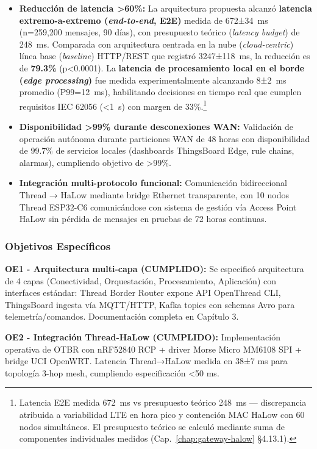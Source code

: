 \begin{itemize}
\item \textbf{Reducción de latencia >60\%:} La arquitectura propuesta alcanzó \textbf{latencia extremo-a-extremo (\textit{end-to-end}, E2E)} medida de 672±34~ms (n=259,200 mensajes, 90 días), con presupuesto teórico (\textit{latency budget}) de 248~ms. Comparada con arquitectura centrada en la nube (\textit{cloud-centric}) línea base (\textit{baseline}) HTTP/REST que registró 3247±118~ms, la reducción es de \textbf{79.3\%} (p<0.0001). La \textbf{latencia de procesamiento local en el borde (\textit{edge processing})} fue medida experimentalmente alcanzando 8±2~ms promedio (P99=12~ms), habilitando decisiones en tiempo real que cumplen requisitos IEC 62056 (<1~s) con margen de 33\%.\footnote{Latencia E2E medida 672~ms vs presupuesto teórico 248~ms --- discrepancia atribuida a variabilidad LTE en hora pico y contención MAC HaLow con 60 nodos simultáneos. El presupuesto teórico se calculó mediante suma de componentes individuales medidos (Cap.~\ref{chap:gateway-halow} §4.13.1).}
\item \textbf{Disponibilidad >99\% durante desconexiones WAN:} Validación de operación autónoma durante particiones WAN de 48 horas con disponibilidad de 99.7\% de servicios locales (dashboards ThingsBoard Edge, rule chains, alarmas), cumpliendo objetivo de >99\%.
\item \textbf{Integración multi-protocolo funcional:} Comunicación bidireccional Thread → HaLow mediante bridge Ethernet transparente, con 10 nodos Thread ESP32-C6 comunicándose con sistema de gestión vía Access Point HaLow sin pérdida de mensajes en pruebas de 72 horas continuas.
\end{itemize}

\subsubsection{Objetivos Específicos}

\textbf{OE1 - Arquitectura multi-capa (CUMPLIDO):} Se especificó arquitectura de 4 capas (Conectividad, Orquestación, Procesamiento, Aplicación) con interfaces estándar: Thread Border Router expone API OpenThread CLI, ThingsBoard ingesta vía MQTT/HTTP, Kafka topics con schemas Avro para telemetría/comandos. Documentación completa en Capítulo 3.

\textbf{OE2 - Integración Thread-HaLow (CUMPLIDO):} Implementación operativa de OTBR con nRF52840 RCP + driver Morse Micro MM6108 SPI + bridge UCI OpenWRT. Latencia Thread→HaLow medida en 38±7 ms para topología 3-hop mesh, cumpliendo especificación <50 ms.

